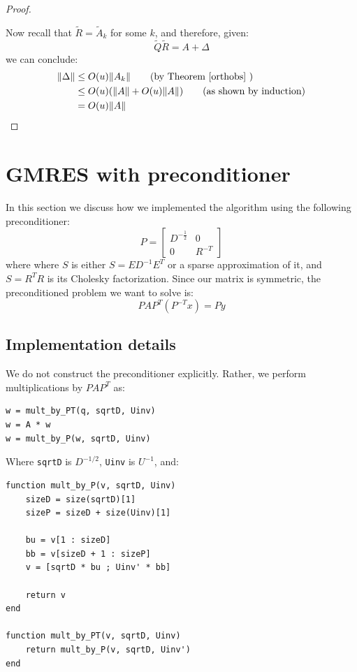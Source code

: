 \documentclass{article}
\begin{document}
\begin{proof}
\begin{itemize}
\end{itemize}
Now recall that $\widetilde R = \widetilde A_k$ for some $k$, and therefore, given:
\[ \widetilde Q \widetilde R = A + \Delta \]
we can conclude:
\begin{align*}
 \|\Delta\| &\leq O(u)\|A_k\| \tag{by Theorem \ref{orthobs} }\\
 &\leq O(u) (\|A\| + O(u)\|A\|) \tag{as shown by induction}\\
 &= O(u)\|A\|
\end{align*}

\end{proof}

\newpage
\section{GMRES with preconditioner}

In this section we discuss how we implemented the algorithm using the following preconditioner: $$P = \begin{bmatrix}
     D^{-\frac12} & 0\\
     0 & R^{-T}
    \end{bmatrix}$$
    where where $S$
 is either $S=ED^{-1}E^T$
 or a sparse approximation of it, and $S = R^TR$ is its Cholesky factorization.
 Since our matrix is symmetric, the preconditioned problem we want to solve is:
    \[ PAP^T(P^{-T}x) = Py \]

    \subsection{Implementation details}
    We do not construct the preconditioner explicitly. Rather, we perform multiplications by $PAP^T$ as:
        \lstset{style=mystyle_tt}
    \begin{lstlisting}
w = mult_by_PT(q, sqrtD, Uinv)
w = A * w
w = mult_by_P(w, sqrtD, Uinv)\end{lstlisting}
    Where \texttt{sqrtD} is $D^{-1/2}$, \texttt{Uinv} is $U^{-1}$, and:
\begin{lstlisting}
function mult_by_P(v, sqrtD, Uinv)
    sizeD = size(sqrtD)[1]
    sizeP = sizeD + size(Uinv)[1]

    bu = v[1 : sizeD]
    bb = v[sizeD + 1 : sizeP]
    v = [sqrtD * bu ; Uinv' * bb]

    return v
end

function mult_by_PT(v, sqrtD, Uinv)
    return mult_by_P(v, sqrtD, Uinv')
end\end{lstlisting}
\end{document}
